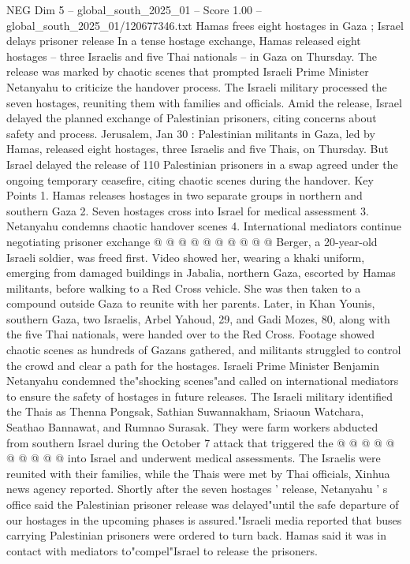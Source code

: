 \begin{textsample}{NEG Dim 5 – global\_south\_2025\_01 – Score 1.00 – global\_south\_2025\_01/120677346.txt}  \label{ex:f5_neg_109}
Hamas frees eight hostages in Gaza ; Israel delays prisoner release In a tense hostage exchange, Hamas released eight hostages -- three Israelis and five Thai nationals -- in Gaza on Thursday.
The release was marked by chaotic scenes that prompted Israeli Prime Minister Netanyahu to criticize the handover process.
The Israeli military processed the seven hostages, reuniting them with families and officials.
Amid the release, Israel delayed the planned exchange of Palestinian prisoners, citing concerns about safety and process.
Jerusalem, Jan 30 : Palestinian militants in Gaza, led by Hamas, released eight hostages, three Israelis and five Thais, on Thursday.
But Israel delayed the release of 110 Palestinian prisoners in a swap agreed under the ongoing temporary ceasefire, citing chaotic scenes during the handover.
Key Points 1.
Hamas releases hostages in two separate groups in northern and southern Gaza 2.
Seven hostages cross into Israel for medical assessment 3.
Netanyahu condemns chaotic handover scenes 4.
International mediators continue negotiating prisoner exchange @ @ @ @ @ @ @ @ @ @ Berger, a 20-year-old Israeli soldier, was freed first.
Video showed her, wearing a khaki uniform, emerging from damaged buildings in Jabalia, northern Gaza, escorted by Hamas militants, before walking to a Red Cross vehicle.
She was then taken to a compound outside Gaza to reunite with her parents.
Later, in Khan Younis, southern Gaza, two Israelis, Arbel Yahoud, 29, and Gadi Mozes, 80, along with the five Thai nationals, were handed over to the Red Cross.
Footage showed chaotic scenes as hundreds of Gazans gathered, and militants struggled to control the crowd and clear a path for the hostages.
Israeli Prime Minister Benjamin Netanyahu condemned the"shocking scenes"and called on international mediators to ensure the safety of hostages in future releases.
The Israeli military identified the Thais as Thenna Pongsak, Sathian Suwannakham, Sriaoun Watchara, Seathao Bannawat, and Rumnao Surasak.
They were farm workers abducted from southern Israel during the October 7 attack that triggered the @ @ @ @ @ @ @ @ @ @ into Israel and underwent medical assessments.
The Israelis were reunited with their families, while the Thais were met by Thai officials, Xinhua news agency reported.
Shortly after the seven hostages ' release, Netanyahu ' s office said the Palestinian prisoner release was delayed"until the safe departure of our hostages in the upcoming phases is assured."Israeli media reported that buses carrying Palestinian prisoners were ordered to turn back.
Hamas said it was in contact with mediators to"compel"Israel to release the prisoners.

\end{textsample}
